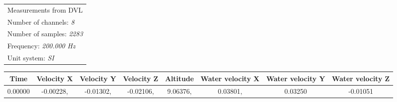 \documentclass[]{article}
\begin{document}
	\begin{table}[ht]
			\begin{flushleft}
			\begin{tabular}{l}
				\toprule 
				\footnotesize Measurements from DVL \\
				\footnotesize Number of channels: \textit{8} \\
				\footnotesize Number of samples: \textit{2283} \\
				\footnotesize Frequency: \textit{200.000 Hz} \\
				\footnotesize Unit system: \textit{SI} \\
			\end{tabular}
			
			\end{flushleft}
		\begin{center}
			\begin{tabular}{cccccccc}
			\toprule [1]
			\footnotesize Time & \footnotesize Velocity X &	\footnotesize Velocity Y &	\footnotesize Velocity Z &	\footnotesize Altitude &	 \footnotesize Water velocity X 	&	\footnotesize Water velocity Y  &	\footnotesize Water velocity Z\\
			\midrule
			\footnotesize 0.00000	& \footnotesize -0.00228, &	\footnotesize \footnotesize -0.01302,&	\footnotesize -0.02106,&	\footnotesize 9.06376,& \footnotesize 0.03801, &	\footnotesize 0.03250	& \footnotesize -0.01051 \\
			

\end{tabular}
\end{center}
\end{table}
\end{document}
